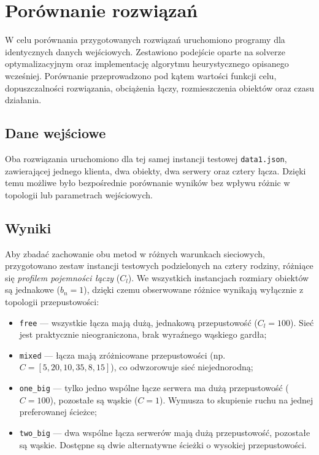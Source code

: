 \documentclass{article}
\begin{document}
\section{Porównanie rozwiązań}

W celu porównania przygotowanych rozwiązań uruchomiono programy dla identycznych danych wejściowych. Zestawiono podejście oparte na solverze optymalizacyjnym oraz implementację algorytmu heurystycznego opisanego wcześniej. Porównanie przeprowadzono pod kątem wartości funkcji celu, dopuszczalności rozwiązania, obciążenia łączy, rozmieszczenia obiektów oraz czasu działania.

\subsection{Dane wejściowe}

Oba rozwiązania uruchomiono dla tej samej instancji testowej \texttt{data1.json}, zawierającej jednego klienta, dwa obiekty, dwa serwery oraz cztery łącza. Dzięki temu możliwe było bezpośrednie porównanie wyników bez wpływu różnic w topologii lub parametrach wejściowych.

\subsection{Wyniki}

Aby zbadać zachowanie obu metod w różnych warunkach sieciowych, przygotowano zestaw instancji testowych podzielonych na cztery rodziny, różniące się \emph{profilem pojemności łączy} ($C_l$). We wszystkich instancjach rozmiary obiektów są jednakowe ($b_n = 1$), dzięki czemu obserwowane różnice wynikają wyłącznie z topologii przepustowości:
\begin{itemize}
    \item \texttt{free} — wszystkie łącza mają dużą, jednakową przepustowość ($C_l = 100$). Sieć jest praktycznie nieograniczona, brak wyraźnego wąskiego gardła;
    \item \texttt{mixed} — łącza mają zróżnicowane przepustowości (np. $C = [5, 20, 10, 35, 8, 15]$), co odwzorowuje sieć niejednorodną;
    \item \texttt{one\_big} — tylko jedno wspólne łącze serwera ma dużą przepustowość ($C = 100$), pozostałe są wąskie ($C = 1$). Wymusza to skupienie ruchu na jednej preferowanej ścieżce;
    \item \texttt{two\_big} — dwa wspólne łącza serwerów mają dużą przepustowość, pozostałe są wąskie. Dostępne są dwie alternatywne ścieżki o wysokiej przepustowości.
\end{itemize}
\end{document}
